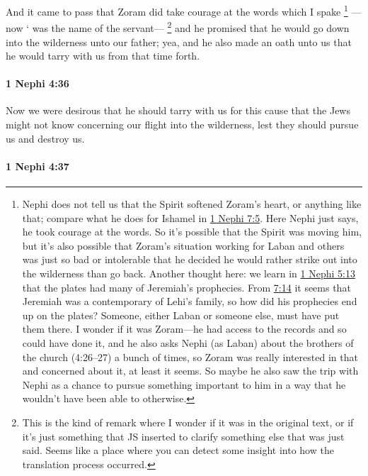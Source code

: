 			And it came to pass that Zoram did take courage at the words which I spake%
				\footnote{%
					Nephi does not tell us that the Spirit softened Zoram's heart, or anything like that; compare what he does for Ishamel in \hyperref[1NEPHI-7-5]{1 Nephi 7:5}. Here Nephi just says, he took courage at the words. So it's possible that the Spirit was moving him, but it's also possible that Zoram's situation working for Laban and others was just so bad or intolerable that he decided he would rather strike out into the wilderness than go back. Another thought here: we learn in \hyperref[1NEPHI-5-13]{1 Nephi 5:13} that the plates had many of Jeremiah's prophecies. From \hyperref[1NEPHI-7-14]{7:14} it seems that Jeremiah was a contemporary of Lehi's family, so how did his prophecies end up on the plates? Someone, either Laban or someone else, must have put them there. I wonder if it was Zoram---he had access to the records and so could have done it, and he also asks Nephi (as Laban) about the brothers of the church (4:26--27) a bunch of times, so Zoram was really interested in that and concerned about it, at least it seems. So maybe he also saw the trip with Nephi as a chance to pursue something important to him in a way that he wouldn't have been able to otherwise.
					}
			---now ` was the name of the servant---%
				\footnote{%
					This is the kind of remark where I wonder if it was in the original text, or if it's just something that JS inserted to clarify something else that was just said. Seems like a place where you can detect some insight into how the translation process occurred.
					}
			and he promised that he would go down into the wilderness unto our father;
			yea, and he also made an oath unto us
			that he would tarry with us from that time forth.

		\paragraph{1 Nephi 4:36} %
			\label{1NEPHI-4-36}

			Now we were desirous that he should tarry with us for this cause
			that the Jews might not know concerning our flight into the wilderness,
			lest they should pursue us and destroy us.

		\paragraph{1 Nephi 4:37} %
			\label{1NEPHI-4-37}

